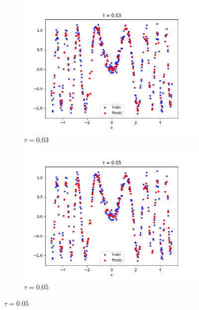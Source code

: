\begin{answer}
\begin{figure}[H]
  \centering

  \begin{subfigure}[b]{0.48\textwidth}
    \includegraphics[width=\textwidth]{lwr/tau=0.03.png}
    \caption*{\(\tau = 0.03\)}
  \end{subfigure}
  \hfill
  \begin{subfigure}[b]{0.48\textwidth}
    \includegraphics[width=\textwidth]{lwr/tau=0.05.png}
    \caption*{\(\tau = 0.05\)}
  \end{subfigure}

  \vspace{0.02\textheight} %


\end{figure}
\end{answer}
